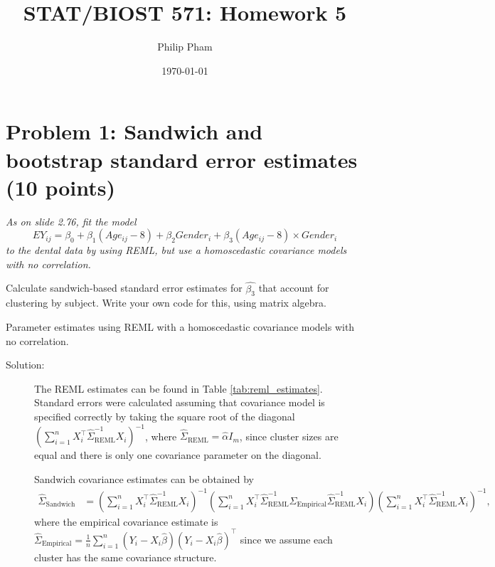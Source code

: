 \documentclass[11pt, letterpaper]{article}
\title{STAT/BIOST 571: Homework 5}
\author{Philip Pham}
\date{\today}
\begin{document}
\maketitle

\section*{Problem 1: Sandwich and bootstrap standard error estimates (10 points)}
{\em As on slide 2.76, fit the model
\[
EY_{ij}=\beta_0 +\beta_1(Age_{ij}-8)+\beta_2 Gender_i + \beta_3(Age_{ij} -8)\times Gender _i
\]
to the dental data by using REML, but use a homoscedastic covariance models with no correlation.}
\begin{enumerate}[(a)]
{\em \item Calculate sandwich-based standard error estimates for $\hat{\beta_3}$ that account for clustering by subject.  Write your
  own code for this, using matrix algebra.}

\begin{table}[h]
  \centering
  
  \caption{Parameter estimates using REML with a homoscedastic covariance models
    with no correlation.}
  \label{tab:reml_estimates}
\end{table}

\begin{description}
\item[Solution:] The REML estimates can be found in Table
  \ref{tab:reml_estimates}. Standard errors were calculated assuming that
  covariance model is specified correctly by taking the square root of the
  diagonal
  $\left(\sum_{i=1}^n X_i^\intercal \hat{\Sigma}^{-1}_{\text{REML}}
    X_i\right)^{-1}$, where $\hat{\Sigma}_{\text{REML}} = \hat{\alpha} I_m$,
  since cluster sizes are equal and there is only one covariance parameter on
  the diagonal.
  
  Sandwich covariance estimates can be obtained by
  \begin{align*}
    \hat{\Sigma}_{\text{Sandwich}}
    &=
    \left(\sum_{i=1}^n X_i^\intercal \hat{\Sigma}^{-1}_{\text{REML}} X_i\right)^{-1}
    \left(\sum_{i=1}^n X_i^\intercal\hat{\Sigma}^{-1}_{\text{REML}}
      \hat{\Sigma}_{\text{Empirical}}
      \hat{\Sigma}^{-1}_{\text{REML}}X_i\right)
    \left(\sum_{i=1}^n X_i^\intercal \hat{\Sigma}^{-1}_{\text{REML}} X_i\right)^{-1},
  \end{align*}
  where the empirical covariance estimate is
  $\hat{\Sigma}_{\text{Empirical}} = \frac{1}{n}\sum_{i=1}^n \left(Y_i -
    X_i\hat{\beta}\right)\left(Y_i - X_i\hat{\beta}\right)^\intercal$ since we
  assume each cluster has the same covariance structure.


\end{description}
\end{enumerate}
\end{document}
